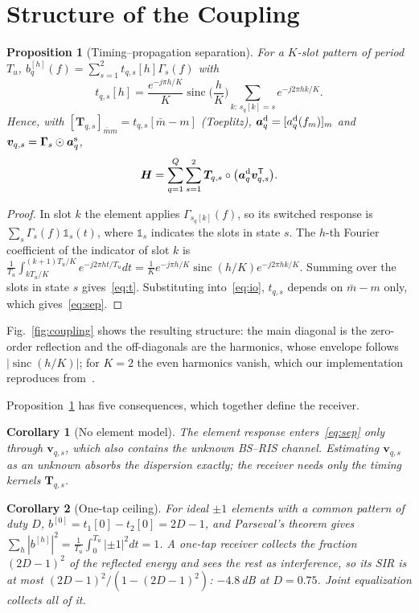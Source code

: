 \documentclass[conference,10pt]{IEEEtran}
\newtheorem{proposition}{Proposition}
\newtheorem{corollary}{Corollary}
\theoremstyle{remark}
\DeclareMathOperator{\sinc}{sinc}
\newcommand{\T}{\mathsf T}
\begin{document}
\section{Structure of the Coupling}\label{sec:structure}
\begin{proposition}[Timing--propagation separation]\label{prop:sep}
For a $K$-slot pattern of period $T_u$, $b_q^{[h]}(f)=\sum_{s=1}^{2}t_{q,s}[h]\Gamma_s(f)$ with
\begin{equation}
t_{q,s}[h]=\frac{e^{-j\pi h/K}}{K}\sinc\Big(\frac hK\Big)\sum_{k:\,s_q[k]=s}e^{-j2\pi hk/K}.\label{eq:t}
\end{equation}
Hence, with $[\bm T_{q,s}]_{\bar mm}=t_{q,s}[\bar m-m]$ (Toeplitz), $\bm a^{\rm d}_q=[a^{\rm d}_q(f_m)]_m$ and
$\bm v_{q,s}=\bm\Gamma_s\odot\bm a^{\rm s}_q$,
\begin{equation}
\bm H=\sum_{q=1}^{Q}\sum_{s=1}^{2}\bm T_{q,s}\circ\big(\bm a^{\rm d}_q\bm v_{q,s}^{\T}\big).\label{eq:sep}
\end{equation}
\end{proposition}
\begin{proof}
In slot $k$ the element applies $\Gamma_{s_q[k]}(f)$, so its switched response is $\sum_s\Gamma_s(f)\mathbb 1_s(t)$, where
$\mathbb 1_s$ indicates the slots in state $s$. The $h$-th Fourier coefficient of the indicator of slot $k$ is
$\frac1{T_u}\int_{kT_u/K}^{(k+1)T_u/K}e^{-j2\pi ht/T_u}dt=\frac1Ke^{-j\pi h/K}\sinc(h/K)e^{-j2\pi hk/K}$. Summing over the
slots in state $s$ gives~\eqref{eq:t}. Substituting into~\eqref{eq:io}, $t_{q,s}$ depends on $\bar m-m$ only, which
gives~\eqref{eq:sep}.
\end{proof}
Fig.~\ref{fig:coupling} shows the resulting structure: the main diagonal is the zero-order reflection and the
off-diagonals are the harmonics, whose envelope follows $|\sinc(h/K)|$; for $K=2$ the even harmonics vanish, which our
implementation reproduces from~\cite[Fig.~5]{iudice2026}.

Proposition~\ref{prop:sep} has five consequences, which together define the receiver.

\begin{corollary}[No element model]\label{cor:nomodel}
The element response enters~\eqref{eq:sep} only through $\bm v_{q,s}$, which also contains the unknown BS--RIS
channel. Estimating $\bm v_{q,s}$ as an unknown absorbs the dispersion exactly; the receiver needs only the timing
kernels $\bm T_{q,s}$.
\end{corollary}

\begin{corollary}[One-tap ceiling]\label{cor:onetap}
For ideal $\pm1$ elements with a common pattern of duty $D$, $b^{[0]}=t_1[0]-t_2[0]=2D-1$, and Parseval's theorem gives
$\sum_h|b^{[h]}|^2=\frac1{T_u}\int_0^{T_u}|\pm1|^2dt=1$. A one-tap receiver collects the fraction $(2D-1)^2$ of the
reflected energy and sees the rest as interference, so its SIR is at most $(2D-1)^2/(1-(2D-1)^2)$: $-4.8$\,dB at $D=0.75$.
Joint equalization collects all of it.
\end{corollary}
\end{document}
